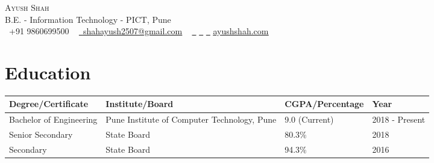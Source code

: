 \documentclass[letterpaper,11pt]{article}
\begin{document}

\begin{center}
    {\Huge \scshape Ayush Shah} \\ \vspace{1pt}
    B.E. - Information Technology - PICT, Pune \\ \vspace{1pt}
    \small \raisebox{-0.1\height}\faPhone\ +91 9860699500 ~ \href{mailto:shahayush2507@gmail.com}{\raisebox{-0.2\height}\faEnvelope\  \underline{shahayush2507@gmail.com}} ~ 
    \href{https://linkedin.com/in/omega07}{\raisebox{-0.2\height}\faLinkedin\ \underline{}}
    \href{https://github.com/omega07}{\raisebox{-0.2\height}\faGithub\ \underline{}}
    \href{https://twitter.com/shahayush2507}{\raisebox{-0.2\height}\faTwitter\ \underline{}}
    \href{https://omega07.github.io/Portfolio/}{\raisebox{-0.2\height}\faGlobe\underline{ayushshah.com}} ~ 
    \vspace{-8pt}
\end{center}


\section{Education}

\begin{tabular}{ |p{4cm}|p{8.2cm}|p{4cm}|p{3.1cm}|  }

 \hline
 \hfil \textbf{Degree/Certificate} & \hfil \textbf{Institute/Board} & \hfil \textbf{CGPA/Percentage} & \hfil \textbf{Year}\\
 \hline
 \hfil {\footnotesize Bachelor of Engineering} & \hfil {\footnotesize Pune Institute of Computer Technology, Pune} & \hfil {\footnotesize 9.0 (Current)}& \hfil {\footnotesize 2018 - Present}\\
 \hfil {\footnotesize Senior Secondary} & \hfil {\footnotesize State Board}  & \hfil {\footnotesize 80.3\%} & \hfil {\footnotesize 2018}\\
 \hfil {\footnotesize Secondary} & \hfil {\footnotesize State Board}  & \hfil {\footnotesize 94.3\%} & \hfil {\footnotesize 2016}\\
 \hline
\end{tabular}
\end{document}
